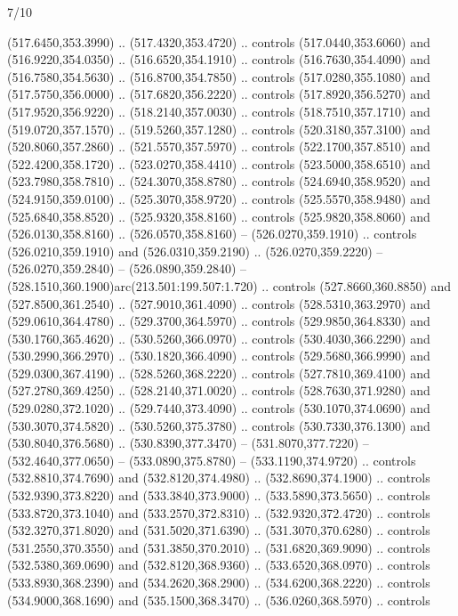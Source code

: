 \begin{flagdescription}{7/10}
\begin{scope}[xshift=0.5\flaglength]
\begin{scope}[scale=0.00185\flagwidth,yshift=245mm,xshift=-43.7mm]
\begin{scope}[y=-0.8pt, x=0.8pt, inner sep=0pt, outer sep=0pt]
\begin{scope}[shift={(0,0)},shift={(0,36.591)}]
\begin{scope}[shift={(-344.0678,183.89831)}]
  (517.6450,353.3990) .. (517.4320,353.4720) .. controls (517.0440,353.6060) and
  (516.9220,354.0350) .. (516.6520,354.1910) .. controls (516.7630,354.4090) and
  (516.7580,354.5630) .. (516.8700,354.7850) .. controls (517.0280,355.1080) and
  (517.5750,356.0000) .. (517.6820,356.2220) .. controls (517.8920,356.5270) and
  (517.9520,356.9220) .. (518.2140,357.0030) .. controls (518.7510,357.1710) and
  (519.0720,357.1570) .. (519.5260,357.1280) .. controls (520.3180,357.3100) and
  (520.8060,357.2860) .. (521.5570,357.5970) .. controls (522.1700,357.8510) and
  (522.4200,358.1720) .. (523.0270,358.4410) .. controls (523.5000,358.6510) and
  (523.7980,358.7810) .. (524.3070,358.8780) .. controls (524.6940,358.9520) and
  (524.9150,359.0100) .. (525.3070,358.9720) .. controls (525.5570,358.9480) and
  (525.6840,358.8520) .. (525.9320,358.8160) .. controls (525.9820,358.8060) and
  (526.0130,358.8160) .. (526.0570,358.8160) -- (526.0270,359.1910) .. controls
  (526.0210,359.1910) and (526.0310,359.2190) .. (526.0270,359.2220) --
  (526.0270,359.2840) -- (526.0890,359.2840) --
  (528.1510,360.1900)arc(213.501:199.507:1.720) .. controls (527.8660,360.8850)
  and (527.8500,361.2540) .. (527.9010,361.4090) .. controls (528.5310,363.2970)
  and (529.0610,364.4780) .. (529.3700,364.5970) .. controls (529.9850,364.8330)
  and (530.1760,365.4620) .. (530.5260,366.0970) .. controls (530.4030,366.2290)
  and (530.2990,366.2970) .. (530.1820,366.4090) .. controls (529.5680,366.9990)
  and (529.0300,367.4190) .. (528.5260,368.2220) .. controls (527.7810,369.4100)
  and (527.2780,369.4250) .. (528.2140,371.0020) .. controls (528.7630,371.9280)
  and (529.0280,372.1020) .. (529.7440,373.4090) .. controls (530.1070,374.0690)
  and (530.3070,374.5820) .. (530.5260,375.3780) .. controls (530.7330,376.1300)
  and (530.8040,376.5680) .. (530.8390,377.3470) -- (531.8070,377.7220) --
  (532.4640,377.0650) -- (533.0890,375.8780) -- (533.1190,374.9720) .. controls
  (532.8810,374.7690) and (532.8120,374.4980) .. (532.8690,374.1900) .. controls
  (532.9390,373.8220) and (533.3840,373.9000) .. (533.5890,373.5650) .. controls
  (533.8720,373.1040) and (533.2570,372.8310) .. (532.9320,372.4720) .. controls
  (532.3270,371.8020) and (531.5020,371.6390) .. (531.3070,370.6280) .. controls
  (531.2550,370.3550) and (531.3850,370.2010) .. (531.6820,369.9090) .. controls
  (532.5380,369.0690) and (532.8120,368.9360) .. (533.6520,368.0970) .. controls
  (533.8930,368.2390) and (534.2620,368.2900) .. (534.6200,368.2220) .. controls
  (534.9000,368.1690) and (535.1500,368.3470) .. (536.0260,368.5970) .. controls

\end{scope}
\end{scope}
\end{scope}
\end{scope}
\end{scope}
\end{flagdescription}
